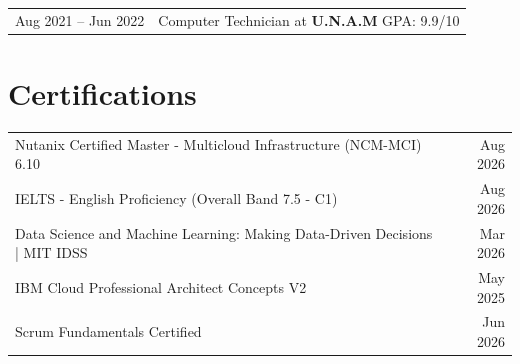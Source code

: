 \documentclass[a4paper,11pt]{article}
\begin{document}
\begin{tabularx}{\linewidth}{@{}l X@{}}	
Aug 2021 -- Jun 2022 & Computer Technician at \textbf{U.N.A.M} \hfill GPA: 9.9/10  
\end{tabularx}


\section{Certifications}

\begin{tabularx}{\linewidth}{@{}X r@{}}
Nutanix Certified Master - Multicloud Infrastructure (NCM-MCI) 6.10 & Aug 2026 \\
IELTS - English Proficiency (Overall Band 7.5 - C1) & Aug 2026 \\
Data Science and Machine Learning: Making Data-Driven Decisions | MIT IDSS & Mar 2026 \\
IBM Cloud Professional Architect Concepts V2 & May 2025 \\
Scrum Fundamentals Certified & Jun 2026 \\
\end{tabularx}







\end{document}
